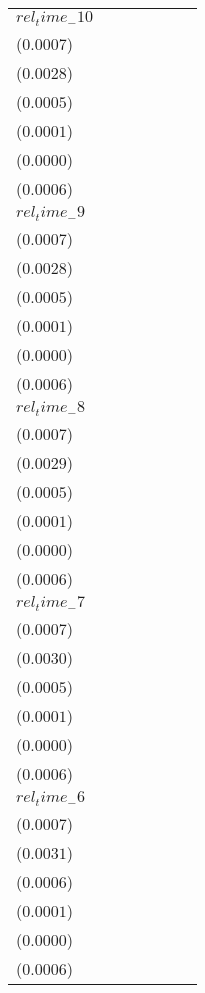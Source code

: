 \begin{tabular}{lllllll}
$rel_time_-10$ & \makecell{$-0.0004^{}$ \\ ($0.0007$)} & \makecell{$-0.0020^{}$ \\ ($0.0028$)} & \makecell{$0.0004^{}$ \\ ($0.0005$)} & \makecell{$0.0000^{}$ \\ ($0.0001$)} & \makecell{$0.0000^{}$ \\ ($0.0000$)} & \makecell{$-0.0002^{}$ \\ ($0.0006$)} \\
$rel_time_-9$ & \makecell{$-0.0020^{***}$ \\ ($0.0007$)} & \makecell{$-0.0073^{***}$ \\ ($0.0028$)} & \makecell{$-0.0001^{}$ \\ ($0.0005$)} & \makecell{$-0.0000^{}$ \\ ($0.0001$)} & \makecell{$0.0000^{}$ \\ ($0.0000$)} & \makecell{$-0.0016^{***}$ \\ ($0.0006$)} \\
$rel_time_-8$ & \makecell{$-0.0021^{***}$ \\ ($0.0007$)} & \makecell{$-0.0099^{***}$ \\ ($0.0029$)} & \makecell{$-0.0006^{}$ \\ ($0.0005$)} & \makecell{$-0.0001^{*}$ \\ ($0.0001$)} & \makecell{$-0.0000^{}$ \\ ($0.0000$)} & \makecell{$-0.0021^{***}$ \\ ($0.0006$)} \\
$rel_time_-7$ & \makecell{$-0.0005^{}$ \\ ($0.0007$)} & \makecell{$-0.0022^{}$ \\ ($0.0030$)} & \makecell{$0.0006^{}$ \\ ($0.0005$)} & \makecell{$0.0000^{}$ \\ ($0.0001$)} & \makecell{$0.0000^{}$ \\ ($0.0000$)} & \makecell{$-0.0006^{}$ \\ ($0.0006$)} \\
$rel_time_-6$ & \makecell{$0.0007^{}$ \\ ($0.0007$)} & \makecell{$0.0028^{}$ \\ ($0.0031$)} & \makecell{$0.0041^{***}$ \\ ($0.0006$)} & \makecell{$0.0003^{***}$ \\ ($0.0001$)} & \makecell{$0.0001^{***}$ \\ ($0.0000$)} & \makecell{$0.0008^{}$ \\ ($0.0006$)} \\

\end{tabular}
